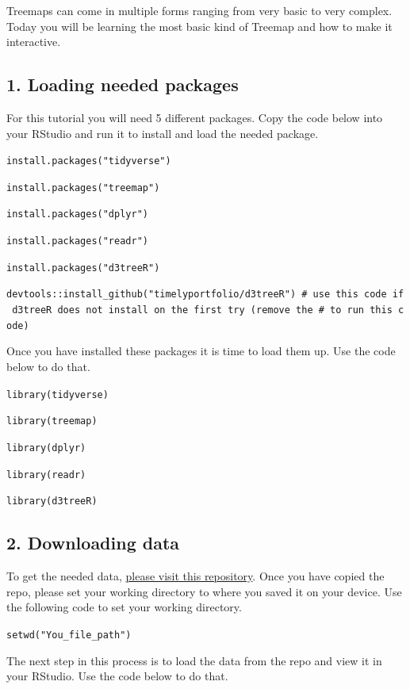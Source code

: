 \documentclass[
]{article}
\begin{document}
Treemaps can come in multiple forms ranging from very basic to very
complex. Today you will be learning the most basic kind of Treemap and
how to make it interactive.

\hypertarget{loading-needed-packages-1}{%
\subsection{1. Loading needed
packages}\label{loading-needed-packages-1}}

For this tutorial you will need 5 different packages. Copy the code
below into your RStudio and run it to install and load the needed
package.

\texttt{install.packages("tidyverse")}

\texttt{install.packages("treemap")}

\texttt{install.packages("dplyr")}

\texttt{install.packages("readr")}

\texttt{install.packages("d3treeR")}

\texttt{devtools::install\_github("timelyportfolio/d3treeR")\ \#\ use\ this\ code\ if\ d3treeR\ does\ not\ install\ on\ the\ first\ try\ (remove\ the\ \#\ to\ run\ this\ code)}

Once you have installed these packages it is time to load them up. Use
the code below to do that.

\texttt{library(tidyverse)}

\texttt{library(treemap)}

\texttt{library(dplyr)}

\texttt{library(readr)}

\texttt{library(d3treeR)}

\hypertarget{downloading-data-1}{%
\subsection{2. Downloading data}\label{downloading-data-1}}

To get the needed data,
\href{https://github.com/EdDataScienceEES/tutorial-Hannalh14}{please
visit this repository}. Once you have copied the repo, please set your
working directory to where you saved it on your device. Use the
following code to set your working directory.

\texttt{setwd("You\_file\_path")}

The next step in this process is to load the data from the repo and view
it in your RStudio. Use the code below to do that.
\end{document}
